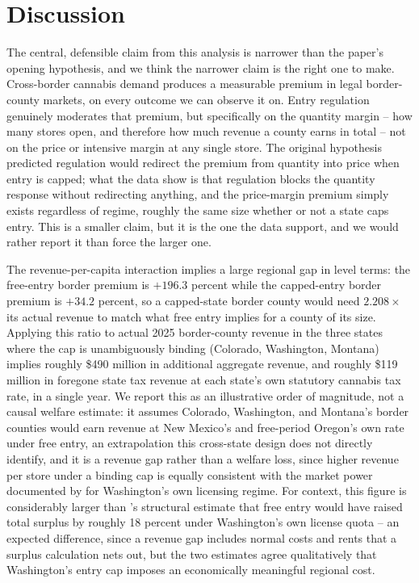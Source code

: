 \documentclass[12pt]{article}
\begin{document}
\section{Discussion}
\label{sec:discussion}

The central, defensible claim from this analysis is narrower than the paper's opening hypothesis, and we think
the narrower claim is the right one to make. Cross-border cannabis demand produces a measurable premium in
legal border-county markets, on every outcome we can observe it on. Entry regulation genuinely moderates that
premium, but specifically on the quantity margin -- how many stores open, and therefore how much revenue a
county earns in total -- not on the price or intensive margin at any single store. The original hypothesis
predicted regulation would redirect the premium from quantity into price when entry is capped; what the data
show is that regulation blocks the quantity response without redirecting anything, and the price-margin premium
simply exists regardless of regime, roughly the same size whether or not a state caps entry. This is a smaller
claim, but it is the one the data support, and we would rather report it than force the larger one.

\label{sec:magnitude}
The revenue-per-capita interaction implies a large regional gap in level terms: the free-entry border premium
is $+196.3$ percent while the capped-entry border premium is $+34.2$ percent, so a capped-state border county
would need $2.208\times$ its actual revenue to match what free entry implies for a county of its size.
Applying this ratio to actual 2025 border-county revenue in the three states where the cap is unambiguously
binding (Colorado, Washington, Montana) implies roughly \$490 million in additional aggregate revenue, and
roughly \$119 million in foregone state tax revenue at each state's own statutory cannabis tax rate, in a
single year. We report this as an illustrative order of magnitude, not a causal welfare estimate: it assumes
Colorado, Washington, and Montana's border counties would earn revenue at New Mexico's and free-period
Oregon's own rate under free entry, an extrapolation this cross-state design does not directly identify, and
it is a revenue gap rather than a welfare loss, since higher revenue per store under a binding cap is equally
consistent with the market power documented by \citet{HollenbeckUetake2021} for Washington's own licensing
regime. For context, this figure is considerably larger than \citet{Thomas2019LicenseQuotas}'s structural
estimate that free entry would have raised total surplus by roughly 18 percent under Washington's own license
quota -- an expected difference, since a revenue gap includes normal costs and rents that a surplus
calculation nets out, but the two estimates agree qualitatively that Washington's entry cap imposes an
economically meaningful regional cost.
\end{document}
